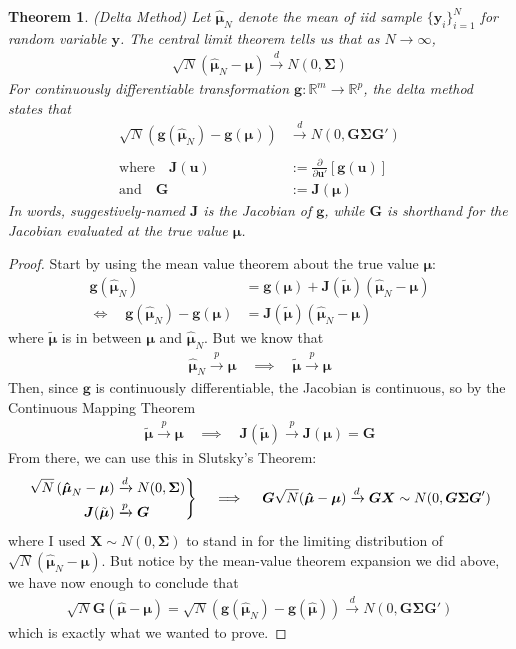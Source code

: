 \documentclass[12pt]{article}
\theoremstyle{plain}
\newtheorem{thm}{Theorem}[section]
\theoremstyle{definition}
\theoremstyle{remark}
\newcommand{\bsg}{\boldsymbol{g}}
\newcommand{\bsG}{\boldsymbol{G}}
\newcommand{\bsJ}{\boldsymbol{J}}
\newcommand{\bsu}{\boldsymbol{u}}
\newcommand{\bsX}{\boldsymbol{X}}
\newcommand{\bsy}{\boldsymbol{y}}
\newcommand{\bsmu}{\boldsymbol{\mu}}
\newcommand{\bsSigma}{\boldsymbol{\Sigma}}
\newcommand{\bshatmu}{\boldsymbol{\hat{\mu}}}
\newcommand{\bsGp}{\boldsymbol{G'}}
\newcommand{\bsup}{\boldsymbol{u'}}
\newcommand{\R}{\mathbb{R}}
\newenvironment{rcases}
  {\left.\begin{aligned}}
  {\end{aligned}\right\rbrace}
\newcommand{\pto}{\xrightarrow{p}}
\newcommand{\dto}{\xrightarrow{d}}
\begin{document}
\begin{thm}\emph{(Delta Method)}
Let $\bshatmu_N$ denote the mean of iid sample
$\{\bsy_i\}^N_{i=1}$ for random variable $\bsy$.
The central limit theorem tells us that as $N\rightarrow\infty$,
\begin{align*}
  \sqrt{N}\left(
  \bshatmu_N
  -\bsmu
  \right)
  \xrightarrow{d} N(0, \bsSigma)
\end{align*}
For continuously differentiable transformation $\bsg:\R^m\rightarrow
\R^p$, the \emph{delta method} states that
\begin{align*}
  \sqrt{N}\left(
  \bsg(\bshatmu_N)
  -
  \bsg(\bsmu)
  \right)
  &\xrightarrow{d} N\left(
    0, \bsG \bsSigma \bsGp
  \right)\\\\
  \text{where}\quad
  \bsJ(\bsu)
  &:=\frac{\partial}{\partial \bsup}
  \left[\bsg(\bsu)\right]\\
  \text{and} \quad
  \bsG &:= \bsJ(\bsmu)
\end{align*}
In words, suggestively-named $\bsJ$ is the Jacobian of $\bsg$, while
$\bsG$ is shorthand for the Jacobian evaluated at the true value
$\bsmu$.
\end{thm}
\begin{proof}
Start by using the mean value theorem about the true value $\bsmu$:
\begin{align*}
  \bsg(\bshatmu_N)
  &=
  \bsg(\bsmu)
  + \bsJ(\tilde{\bsmu}) \left( \bshatmu_N - \bsmu \right)\\
  \Leftrightarrow\quad
  \bsg(\bshatmu_N) - \bsg(\bsmu)
  &=
  \bsJ(\tilde{\bsmu}) \left( \bshatmu_N - \bsmu \right)
\end{align*}
where $\tilde{\bsmu}$ is in between $\bsmu$ and $\bshatmu_N$.
But we know that
\begin{align*}
  \bshatmu_N \pto \bsmu
  \quad\implies\quad
  \tilde{\bsmu} \pto \bsmu
\end{align*}
Then, since $\bsg$ is continuously differentiable, the Jacobian is
continuous, so by the Continuous Mapping Theorem
\begin{align*}
  \tilde{\bsmu} \pto \bsmu
  \quad\implies\quad
  \bsJ(\tilde{\bsmu})
  \pto \bsJ(\bsmu) = \bsG
\end{align*}
From there, we can use this in Slutsky's Theorem:
\begin{align*}
  \begin{rcases}
  \sqrt{N}\left(\bshatmu_N-\bsmu\right) &\dto N(0,\bsSigma) \\
  \bsJ(\tilde{\bsmu}) &\pto \bsG
  \end{rcases}
  \quad\implies\quad
  \bsG \sqrt{N} (\bshatmu-\bsmu) \dto
  \bsG \bsX
  \sim N(0,\bsG \bsSigma \bsG')
\end{align*}
where I used $\bsX\sim N(0,\bsSigma)$ to stand in for the limiting
distribution of $\sqrt{N}(\bshatmu_N-\bsmu)$.
But notice by the mean-value theorem expansion we did above, we have
now enough to conclude that
\begin{align*}
  \sqrt{N} \bsG (\bshatmu-\bsmu)
  = \sqrt{N}(\bsg(\bshatmu_N)-\bsg(\bshatmu))
  \dto N(0,\bsG \bsSigma \bsG')
\end{align*}
which is exactly what we wanted to prove.
\end{proof}
\end{document}
